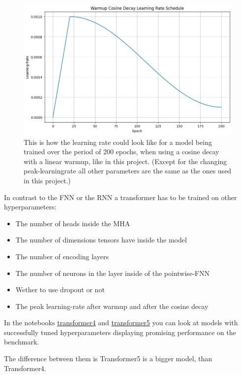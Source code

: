 \documentclass{article}
\begin{document}
\begin{figure}[htbp]
    \centering
    \includegraphics[width=0.5\paperwidth]{images/learningRate.png}
    \caption{This is how the learning rate could look like for a model being 
    trained over the period of 200 epochs, when using a cosine decay with a 
    linear warmup, like in this project. (Except for the changing 
    peak-learningrate all other parameters are the same as the ones used in 
    this project.)}
    \label{fig:learningrate}
\end{figure}

In contrast to the FNN or the RNN a transformer has to be trained on other 
hyperparameters: 
\begin{itemize}
    \item The number of heads inside the MHA
    \item The number of dimensions tensors have inside the model
    \item The number of encoding layers
    \item The number of neurons in the layer inside of the pointwise-FNN
    \item Wether to use dropout or not
    \item The peak learning-rate after warmup and after the cosine decay
\end{itemize}


In the notebooks \href{https://github.com/AntonStantan/matura/blob/main/transformer/transformer4.ipynb}
{transformer4} and \href{https://github.com/AntonStantan/matura/blob/main/transformer/transformer5.ipynb}
{transformer5} you can look at models with successfully tuned 
hyperparameters displaying promising performance on the benchmark.

The difference between them is Transformer5 is a bigger model, than 
Transformer4.
\end{document}
